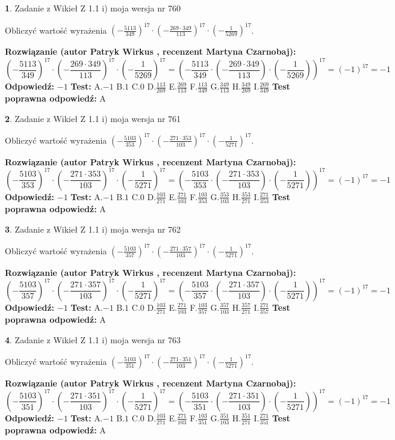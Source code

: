 \documentclass[12pt, a4paper]{article}
\theoremstyle{definition} %
\newtheorem{zad}{}
\newcommand{\zadStart}[1]{\begin{zad}#1\newline}
\newcommand{\zadStop}{\end{zad}}
\newcommand{\rozwStart}[2]{\noindent \textbf{Rozwiązanie (autor #1 , recenzent #2): }\newline}
\newcommand{\rozwStop}{\newline}
\newcommand{\odpStart}{\noindent \textbf{Odpowiedź:}\newline}
\newcommand{\odpStop}{\newline}
\newcommand{\testStart}{\noindent \textbf{Test:}\newline}
\newcommand{\testStop}{\newline}
\newcommand{\kluczStart}{\noindent \textbf{Test poprawna odpowiedź:}\newline}
\newcommand{\kluczStop}{\newline}
\begin{document}
\zadStart{Zadanie z Wikieł Z 1.1 i) moja wersja nr 760}

Obliczyć wartość wyrażenia $(-\frac{5113}{349})^{17} \cdot (-\frac{269 \cdot 349}{113})^{17} \cdot (-\frac{1}{5269})^{17}$.
\zadStop
\rozwStart{Patryk Wirkus}{Martyna Czarnobaj}
$$(-\frac{5113}{349})^{17} \cdot (-\frac{269 \cdot 349}{113})^{17} \cdot (-\frac{1}{5269})^{17} = (-\frac{5113}{349} \cdot (-\frac{269 \cdot 349}{113}) \cdot (-\frac{1}{5269}))^{17} = (-1)^{17} = -1$$
\rozwStop
\odpStart
$-1$
\odpStop
\testStart
A.$-1$ B.$1$ C.$0$ D.$\frac{113}{269}$ E.$\frac{269}{113}$
F.$\frac{113}{349}$ G.$\frac{349}{113}$
H.$\frac{349}{269}$
I.$\frac{269}{349}$
\testStop
\kluczStart
A
\kluczStop



\zadStart{Zadanie z Wikieł Z 1.1 i) moja wersja nr 761}

Obliczyć wartość wyrażenia $(-\frac{5103}{353})^{17} \cdot (-\frac{271 \cdot 353}{103})^{17} \cdot (-\frac{1}{5271})^{17}$.
\zadStop
\rozwStart{Patryk Wirkus}{Martyna Czarnobaj}
$$(-\frac{5103}{353})^{17} \cdot (-\frac{271 \cdot 353}{103})^{17} \cdot (-\frac{1}{5271})^{17} = (-\frac{5103}{353} \cdot (-\frac{271 \cdot 353}{103}) \cdot (-\frac{1}{5271}))^{17} = (-1)^{17} = -1$$
\rozwStop
\odpStart
$-1$
\odpStop
\testStart
A.$-1$ B.$1$ C.$0$ D.$\frac{103}{271}$ E.$\frac{271}{103}$
F.$\frac{103}{353}$ G.$\frac{353}{103}$
H.$\frac{353}{271}$
I.$\frac{271}{353}$
\testStop
\kluczStart
A
\kluczStop



\zadStart{Zadanie z Wikieł Z 1.1 i) moja wersja nr 762}

Obliczyć wartość wyrażenia $(-\frac{5103}{357})^{17} \cdot (-\frac{271 \cdot 357}{103})^{17} \cdot (-\frac{1}{5271})^{17}$.
\zadStop
\rozwStart{Patryk Wirkus}{Martyna Czarnobaj}
$$(-\frac{5103}{357})^{17} \cdot (-\frac{271 \cdot 357}{103})^{17} \cdot (-\frac{1}{5271})^{17} = (-\frac{5103}{357} \cdot (-\frac{271 \cdot 357}{103}) \cdot (-\frac{1}{5271}))^{17} = (-1)^{17} = -1$$
\rozwStop
\odpStart
$-1$
\odpStop
\testStart
A.$-1$ B.$1$ C.$0$ D.$\frac{103}{271}$ E.$\frac{271}{103}$
F.$\frac{103}{357}$ G.$\frac{357}{103}$
H.$\frac{357}{271}$
I.$\frac{271}{357}$
\testStop
\kluczStart
A
\kluczStop



\zadStart{Zadanie z Wikieł Z 1.1 i) moja wersja nr 763}

Obliczyć wartość wyrażenia $(-\frac{5103}{351})^{17} \cdot (-\frac{271 \cdot 351}{103})^{17} \cdot (-\frac{1}{5271})^{17}$.
\zadStop
\rozwStart{Patryk Wirkus}{Martyna Czarnobaj}
$$(-\frac{5103}{351})^{17} \cdot (-\frac{271 \cdot 351}{103})^{17} \cdot (-\frac{1}{5271})^{17} = (-\frac{5103}{351} \cdot (-\frac{271 \cdot 351}{103}) \cdot (-\frac{1}{5271}))^{17} = (-1)^{17} = -1$$
\rozwStop
\odpStart
$-1$
\odpStop
\testStart
A.$-1$ B.$1$ C.$0$ D.$\frac{103}{271}$ E.$\frac{271}{103}$
F.$\frac{103}{351}$ G.$\frac{351}{103}$
H.$\frac{351}{271}$
I.$\frac{271}{351}$
\testStop
\kluczStart
A
\kluczStop
\end{document}
